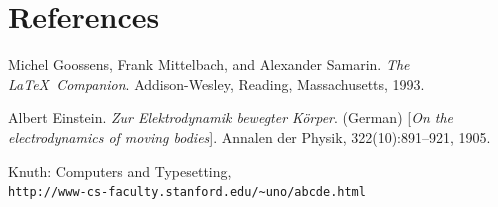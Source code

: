 \documentclass[10pt,a4paper,twocolumn]{article}
\begin{document}
	\section{References}
	
	
	\begin{thebibliography}{9}
		Michel Goossens, Frank Mittelbach, and Alexander Samarin. 
		\textit{The \LaTeX\ Companion}. 
		Addison-Wesley, Reading, Massachusetts, 1993.
		
		Albert Einstein. 
		\textit{Zur Elektrodynamik bewegter K{\"o}rper}. (German) 
		[\textit{On the electrodynamics of moving bodies}]. 
		Annalen der Physik, 322(10):891–921, 1905.
		
		Knuth: Computers and Typesetting,
		\\\texttt{http://www-cs-faculty.stanford.edu/\~{}uno/abcde.html}
	\end{thebibliography}
	
\end{document}
